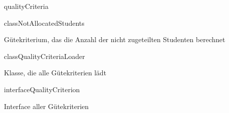 \begin{texdocpackage}{qualityCriteria}
\label{texdoclet:qualityCriteria}

\begin{texdocclass}{class}{NotAllocatedStudents}
\label{texdoclet:qualityCriteria.NotAllocatedStudents}
\begin{texdocclassintro}
Gütekriterium, das die Anzahl der nicht zugeteilten Studenten berechnet\end{texdocclassintro}
\begin{texdocclassconstructors}
\end{texdocclassconstructors}
\begin{texdocclassmethods}
\end{texdocclassmethods}
\end{texdocclass}


\begin{texdocclass}{class}{QualityCriteriaLoader}
\label{texdoclet:qualityCriteria.QualityCriteriaLoader}
\begin{texdocclassintro}
Klasse, die alle Gütekriterien lädt\end{texdocclassintro}
\begin{texdocclassconstructors}
\end{texdocclassconstructors}
\begin{texdocclassmethods}
\end{texdocclassmethods}
\end{texdocclass}


\begin{texdocclass}{interface}{QualityCriterion}
\label{texdoclet:qualityCriteria.QualityCriterion}
\begin{texdocclassintro}
Interface aller Gütekriterien\end{texdocclassintro}
\begin{texdocclassmethods}
\end{texdocclassmethods}
\end{texdocclass}



\end{texdocpackage}
